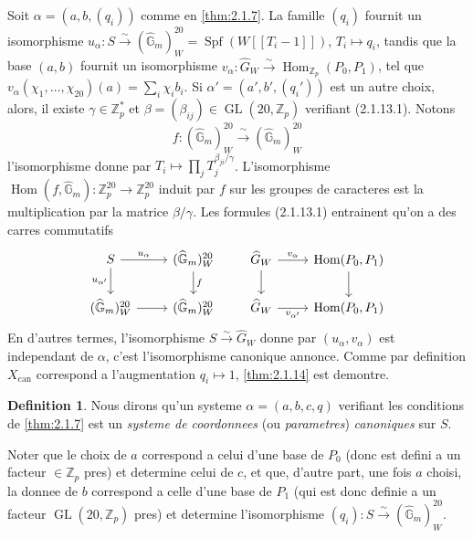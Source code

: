 \documentclass[12pt,a4paper]{article}
\theoremstyle{plain}
\theoremstyle{definition}
\newtheorem{definition}[theorem]{Definition}
\theoremstyle{remark}
\DeclareMathOperator{\Spf}{Spf}
\DeclareMathOperator{\Hom}{Hom}
\DeclareMathOperator{\GL}{GL}
\begin{document}
Soit $\alpha = (a, b, (q_i))$ comme en \ref{thm:2.1.7}. La famille $(q_i)$ fournit un isomorphisme $u_\alpha : S \xrightarrow{\sim} (\widehat{\mathbb{G}}_m)_W^{20} = \Spf(W[[T_i - 1]])$, $T_i \mapsto q_i$, tandis que la base $(a, b)$ fournit un isomorphisme $v_\alpha : \widehat{G}_W \xrightarrow{\sim} \Hom_{\mathbb{Z}_p}(P_0, P_1)$, tel que $v_\alpha(\chi_1, \ldots, \chi_{20})(a) = \sum_i \chi_i b_i$. Si $\alpha' = (a', b', (q_i'))$ est un autre choix, alors, il existe $\gamma \in \mathbb{Z}_p^*$ et $\beta = (\beta_{ij}) \in \GL(20, \mathbb{Z}_p)$ verifiant (2.1.13.1). Notons
\[
f : (\widehat{\mathbb{G}}_m)_W^{20} \xrightarrow{\;\sim\;} (\widehat{\mathbb{G}}_m)_W^{20}
\]
l'isomorphisme donne par $T_i \mapsto \prod_j T_j^{\beta_{ji}/\gamma}$. L'isomorphisme $\Hom(f, \widehat{\mathbb{G}}_m) : \mathbb{Z}_p^{20} \to \mathbb{Z}_p^{20}$ induit par $f$ sur les groupes de caracteres est la multiplication par la matrice $\beta/\gamma$. Les formules (2.1.13.1) entrainent qu'on a des carres commutatifs
\[
\begin{tikzcd}
S \rar{u_\alpha} \dar[swap]{u_{\alpha'}} & (\widehat{\mathbb{G}}_m)_W^{20} \dar{f} \\
(\widehat{\mathbb{G}}_m)_W^{20} \rar & (\widehat{\mathbb{G}}_m)_W^{20}
\end{tikzcd}
\qquad
\begin{tikzcd}
\widehat{G}_W \rar{v_\alpha} \dar & \Hom(P_0, P_1) \dar \\
\widehat{G}_W \rar[swap]{v_{\alpha'}} & \Hom(P_0, P_1)
\end{tikzcd}
\]
En d'autres termes, l'isomorphisme $S \xrightarrow{\sim} \widehat{G}_W$ donne par $(u_\alpha, v_\alpha)$ est independant de $\alpha$, c'est l'isomorphisme canonique annonce. Comme par definition $X_{\mathrm{can}}$ correspond a l'augmentation $q_i \mapsto 1$, \ref{thm:2.1.14} est demontre.

\begin{definition}\label{def:2.1.15}
Nous dirons qu'un systeme $\alpha = (a, b, c, q)$ verifiant les conditions de \ref{thm:2.1.7} est un \emph{systeme de coordonnees} (ou \emph{parametres}) \emph{canoniques} sur $S$.
\end{definition}

Noter que le choix de $a$ correspond a celui d'une base de $P_0$ (donc est defini a un facteur $\in \mathbb{Z}_p$ pres) et determine celui de $c$, et que, d'autre part, une fois $a$ choisi, la donnee de $b$ correspond a celle d'une base de $P_1$ (qui est donc definie a un facteur $\GL(20, \mathbb{Z}_p)$ pres) et determine l'isomorphisme $(q_i) : S \xrightarrow{\sim} (\widehat{\mathbb{G}}_m)_W^{20}$.
\end{document}
